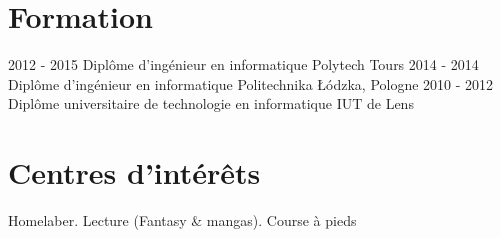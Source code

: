 \documentclass[]{friggeri-cv}
\begin{document}
\section{Formation}
\begin{entrylist}
  \vspace{-6pt}    
  \entry
    {2012 - 2015}
    {Diplôme d'ingénieur en informatique}
    {Polytech Tours}
    {}
  \vspace{-6pt}    
  \entry
    {2014 - 2014}
    {Diplôme d'ingénieur en informatique}
    {Politechnika Łódzka, Pologne}
    {}
  \entry
    {2010 - 2012}
    {Diplôme universitaire de technologie en informatique}
    {IUT de Lens}
    {}
\end{entrylist}

\section{Centres d'intérêts}
\begin{entrylist}
  \entry
    {Homelaber. Lecture (Fantasy \& mangas). Course à pieds}
    {}    {}    {}
\end{entrylist}
\end{document}
